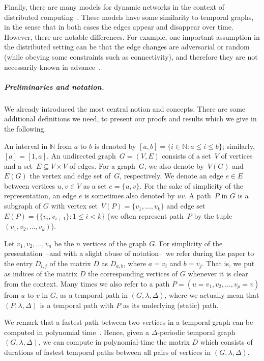 \documentclass[a4paper,UKenglish,cleveref, autoref, thm-restate]{lipics-v2021}
\begin{document}
Finally, there are many models for dynamic networks in the context of distributed computing~\cite{Kuhn2011Dynamic}. 
These models have some similarity to temporal graphs, in the sense that in both cases the edges appear and disappear over time. 
However, there are notable differences. For example, one important assumption in the distributed setting 
can be that the edge changes are adversarial or random (while obeying some constraints such as connectivity), 
and therefore they are not necessarily known in advance~\cite{Kuhn2011Dynamic}. 




\subparagraph{Preliminaries and notation.}
We already introduced the most central notion and concepts. There are some additional definitions we need, to present our proofs and results which we give in the following. 

An interval in $\mathbb N$ from $a$ to $b$ is denoted by $[a,b] = \{ i\in \mathbb N  :  a \leq i \leq b\}$; similarly, $[a] = [1,a]$.
An undirected graph~$G=(V,E)$ consists of a set~$V$ of vertices 
and a set~$E \subseteq V \times V$ of edges.
For a graph~$G$, we also denote by~$V(G)$ and~$E(G)$ the vertex and edge set of~$G$, respectively.
We denote an edge $e \in E$ between vertices $u,v \in V$ as a set $e=\{u,v\}$.
For the sake of simplicity of the representation, an edge $e$ is sometimes also denoted by $uv$. 
A path~$P$ in $G$ is a subgraph of $G$ with vertex set~$V(P)=\{v_1,\dots,v_k\}$ and edge set~$E(P)=\{\{v_i,v_{i+1}\} :  1\leq i<k\}$
(we often represent path~$P$ by the tuple~$(v_1,v_2,\dots,v_k)$).





Let $v_1,v_2,\ldots,v_n$ be the $n$ vertices of the graph $G$. 
For simplicity of the presentation~--and with a slight abuse of notation--~we refer during the paper to the entry $D_{i,j}$ of the matrix $D$ as 
$D_{a,b}$, where $a=v_i$ and $b=v_j$. That is, we put as indices of the matrix $D$ the corresponding vertices of $G$ whenever it is clear from the context.
Many times we also refer to a path $P=(u=v_1, v_2, \dots, v_p=v)$ from $u$ to $v$ in $G$,
as a temporal path in $(G,\lambda,\Delta)$,
where we actually mean that $(P,\lambda,\Delta)$ is a temporal path with $P$ as its underlying (static) path.


We remark that a fastest path between two vertices in a temporal graph can be computed in polynomial time~\cite{xuan_computing_2003,Wu2016Efficient}.
Hence, given a $\Delta$-periodic temporal graph $(G,\lambda,\Delta)$, we can compute in polynomial-time  the matrix $D$
which consists of durations of fastest temporal paths between all pairs of vertices in $(G,\lambda,\Delta)$.
\end{document}
